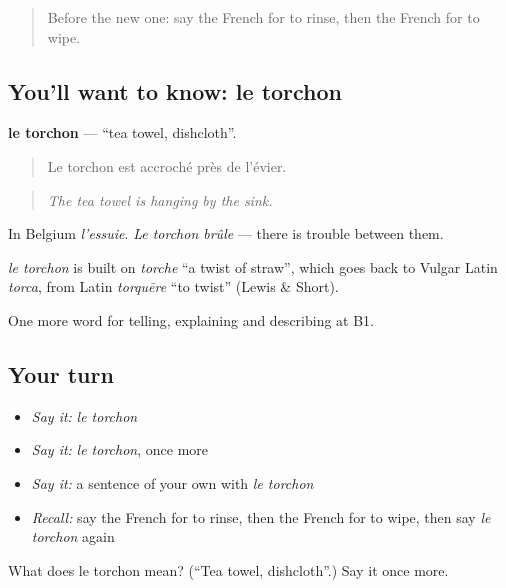 \label{lesson:FR-C530-torchon}



\begin{quote}
Before the new one: say the French for to rinse, then the French for to wipe.
\end{quote}

\subsection*{You'll want to know: le torchon}
\textbf{le torchon} — \textquotedblleft{}tea towel, dishcloth\textquotedblright{}.

\begin{quote}
Le torchon est accroché près de l'évier.
\end{quote}

\begin{quote}
\emph{The tea towel is hanging by the sink.}
\end{quote}

In Belgium \emph{l'essuie}. \emph{Le torchon brûle} — there is trouble between them.

\begin{cousinweb}
\emph{le torchon} is built on \emph{torche} \textquotedblleft{}a twist of straw\textquotedblright{}, which goes back to Vulgar Latin \emph{torca}, from Latin \emph{torquēre} \textquotedblleft{}to twist\textquotedblright{} (Lewis \& Short).
\end{cousinweb}

\begin{grammarlens}[title={What you've built}]
One more word for telling, explaining and describing at B1.
\end{grammarlens}

\subsection*{Your turn}
\begin{itemize}
\raggedright
  \item \emph{Say it:} \emph{le torchon}
  \item \emph{Say it:} \emph{le torchon}, once more
  \item \emph{Say it:} a sentence of your own with \emph{le torchon}
  \item \emph{Recall:} say the French for to rinse, then the French for to wipe, then say \emph{le torchon} again
\end{itemize}

\begin{tcolorbox}[breakable,colback=teal!4,colframe=teal!35!black,title={Before you move on}]
What does le torchon mean? (\textquotedblleft{}Tea towel, dishcloth\textquotedblright{}.) Say it once more.
\end{tcolorbox}
